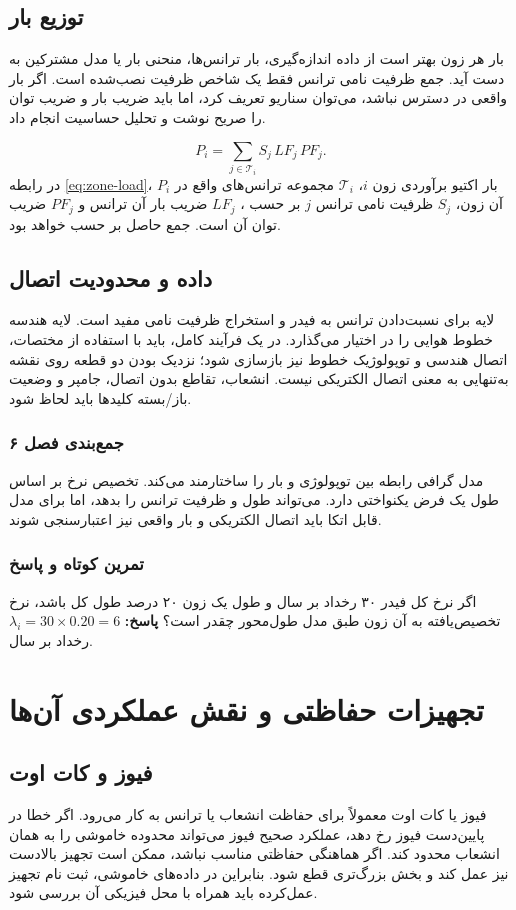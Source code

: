 \documentclass[11pt,a4paper,oneside]{book}
\newcommand{\code}[1]{\lr{\texttt{#1}}}
\newcommand{\summary}[1]{\subsection*{جمع‌بندی فصل #1}}
\newcommand{\exercise}{\subsection*{تمرین کوتاه و پاسخ}}
\newcommand{\answer}{\noindent\textbf{پاسخ:} }
\begin{document}
\section{توزیع بار}
بار هر زون بهتر است از داده اندازه‌گیری، بار ترانس‌ها، منحنی بار یا مدل مشترکین به دست آید. جمع ظرفیت نامی ترانس فقط یک شاخص ظرفیت نصب‌شده است. اگر بار واقعی در دسترس نباشد، می‌توان سناریو تعریف کرد، اما باید ضریب بار و ضریب توان را صریح نوشت و تحلیل حساسیت انجام داد.

\begin{equation}
 P_i=\sum_{j\in\mathcal{T}_i}S_j\,LF_j\,PF_j.
 \label{eq:zone-load}
\end{equation}
در رابطه \eqref{eq:zone-load}، $P_i$ بار اکتیو برآوردی زون $i$، $\mathcal{T}_i$ مجموعه ترانس‌های واقع در آن زون، $S_j$ ظرفیت نامی ترانس $j$ بر حسب ، $LF_j$ ضریب بار آن ترانس و $PF_j$ ضریب توان آن است. جمع حاصل بر حسب  خواهد بود.

\section{داده  و محدودیت اتصال}
لایه \code{ELWDTR} برای نسبت‌دادن ترانس به فیدر و استخراج ظرفیت نامی مفید است. لایه \code{ELWOML} هندسه خطوط هوایی را در اختیار می‌گذارد. در یک فرآیند کامل، باید با استفاده از مختصات، اتصال هندسی و توپولوژیک خطوط نیز بازسازی شود؛ نزدیک بودن دو قطعه روی نقشه به‌تنهایی به معنی اتصال الکتریکی نیست. انشعاب، تقاطع بدون اتصال، جامپر و وضعیت باز/بسته کلیدها باید لحاظ شود.

\summary{۶}
مدل گرافی رابطه بین توپولوژی و بار را ساختارمند می‌کند. تخصیص نرخ بر اساس طول یک فرض یکنواختی دارد.  می‌تواند طول و ظرفیت ترانس را بدهد، اما برای مدل قابل اتکا باید اتصال الکتریکی و بار واقعی نیز اعتبارسنجی شوند.

\exercise
اگر نرخ کل فیدر ۳۰ رخداد بر سال و طول یک زون ۲۰ درصد طول کل باشد، نرخ تخصیص‌یافته به آن زون طبق مدل طول‌محور چقدر است؟
\answer $\lambda_i=30\times0.20=6$ رخداد بر سال.

\chapter{تجهیزات حفاظتی و نقش عملکردی آن‌ها}
\section{فیوز و کات اوت}
فیوز یا کات اوت معمولاً برای حفاظت انشعاب یا ترانس به کار می‌رود. اگر خطا در پایین‌دست فیوز رخ دهد، عملکرد صحیح فیوز می‌تواند محدوده خاموشی را به همان انشعاب محدود کند. اگر هماهنگی حفاظتی مناسب نباشد، ممکن است تجهیز بالادست نیز عمل کند و بخش بزرگ‌تری قطع شود. بنابراین در داده‌های خاموشی، ثبت نام تجهیز عمل‌کرده باید همراه با محل فیزیکی آن بررسی شود.
\end{document}
